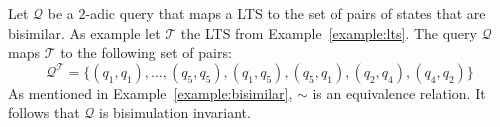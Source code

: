 \begin{example}{\cite{lange2014capturing}}
    \label{example:query_bisimulation}
    Let $\mathcal{Q}$ be a $2$-adic query that maps a LTS to the set of pairs of states that are bisimilar. As
    example let $\mathcal{T}$ the LTS from Example~\ref{example:lts}. The query $\mathcal{Q}$ maps $\mathcal{T}$ to
    the following set of pairs:
    \[\mathcal{Q}^\mathcal{T} = \{(q_1, q_1), \dots, (q_5, q_5), (q_1, q_5), (q_5, q_1), (q_2, q_4), (q_4,
    q_2)\}\]
   As mentioned in Example~\ref{example:bisimilar}, $\sim$ is an
    equivalence relation. It follows that $\mathcal{Q}$ is bisimulation invariant.
\end{example}